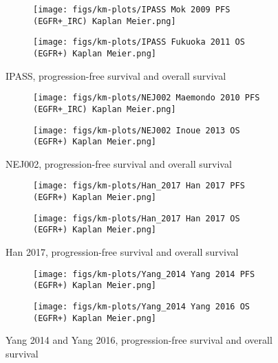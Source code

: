 \documentclass[11pt,final,fleqn]{article}\usepackage[]{graphicx}\usepackage[]{color}
\theoremstyle{plain}
\begin{document}
\begin{appendices}
\begin{figure}
\centering
\begin{subfigure}{\textwidth}
\centering
\texttt{[image: figs/km-plots/IPASS Mok 2009 PFS (EGFR+\_IRC) Kaplan Meier.png]}
\end{subfigure}
\begin{subfigure}{\textwidth}
\texttt{[image: figs/km-plots/IPASS Fukuoka 2011 OS (EGFR+) Kaplan Meier.png]}
\end{subfigure}
\centering
\caption{IPASS, progression-free survival and overall survival}\label{fig:IPASS}
\end{figure}


\begin{figure}
\centering
\begin{subfigure}{\textwidth}
\centering
\texttt{[image: figs/km-plots/NEJ002 Maemondo 2010 PFS (EGFR+\_IRC) Kaplan Meier.png]}
\end{subfigure}
\begin{subfigure}{\textwidth}
\texttt{[image: figs/km-plots/NEJ002 Inoue 2013 OS (EGFR+) Kaplan Meier.png]}
\end{subfigure}
\centering
\caption{NEJ002, progression-free survival and overall survival}\label{fig:NEJ002}
\end{figure}



\begin{figure}
\centering
\begin{subfigure}{\textwidth}
\centering
\texttt{[image: figs/km-plots/Han\_2017 Han 2017 PFS (EGFR+) Kaplan Meier.png]}
\end{subfigure}
\begin{subfigure}{\textwidth}
\texttt{[image: figs/km-plots/Han\_2017 Han 2017 OS (EGFR+) Kaplan Meier.png]}
\end{subfigure}
\centering
\caption{Han 2017, progression-free survival and overall survival}\label{fig:Han-2017}
\end{figure}



\begin{figure}
\centering
\begin{subfigure}{\textwidth}
\centering
\texttt{[image: figs/km-plots/Yang\_2014 Yang 2014 PFS (EGFR+) Kaplan Meier.png]}
\end{subfigure}
\begin{subfigure}{\textwidth}
\texttt{[image: figs/km-plots/Yang\_2014 Yang 2016 OS (EGFR+) Kaplan Meier.png]}
\end{subfigure}
\centering
\caption{Yang 2014 and Yang 2016, progression-free survival and overall survival}\label{fig:Yang 2014}
\end{figure}


\end{appendices}
\end{document}
